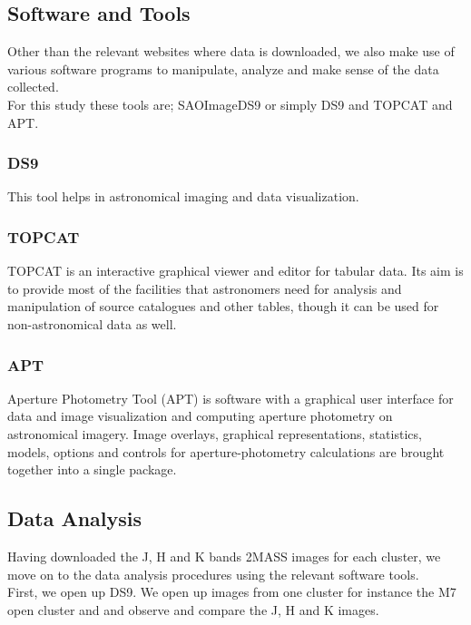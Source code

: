 \documentclass[12pt, twocolumn]{aastex62}
\begin{document}
	\subsection{Software and Tools}
	Other than the relevant websites where data is downloaded, we also make use of various software programs to manipulate, analyze and make sense of the data collected.\\
	For this study these tools are; SAOImageDS9 or simply DS9 and TOPCAT and APT.
		\subsubsection{DS9}
		This tool helps in astronomical imaging and data visualization.
		\subsubsection{TOPCAT}
		TOPCAT is an interactive graphical viewer and editor for tabular data. Its aim is to provide most of the facilities that astronomers need for analysis and manipulation of source catalogues and other tables, though it can be used for non-astronomical data as well.
		\subsubsection{APT}
		Aperture Photometry Tool (APT) is software with a graphical user interface for data and image visualization and computing aperture photometry on astronomical imagery. Image overlays, graphical representations, statistics, models, options and controls for aperture-photometry calculations are brought together into a single package.
	\subsection{Data Analysis}
	Having downloaded the J, H and K bands 2MASS images for each cluster, we move on to the data analysis procedures using the relevant software tools.\\
	First, we open up DS9. We open up images from one cluster for instance the M7 open cluster and and observe and compare the J, H and K images.
\end{document}
